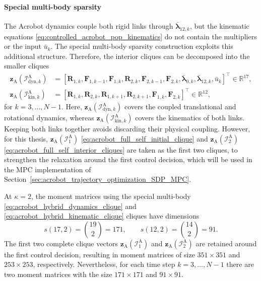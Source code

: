 \paragraph{Special multi-body sparsity}
The Acrobot dynamics couple both rigid links through
$\bar{\bm{\lambda}}_{12,k}$, but the kinematic equations \eqref{eq:controlled_acrobot_pop_kinematics}
do not contain the
multipliers or the input $\bar u_k$. The special multi-body sparsity construction exploits this
additional structure. Therefore, the interior cliques can be decomposed into the smaller cliques
\begin{subequations}
\label{eq:acrobot_hybrid_self_cliques}
\begin{align}
\bm{z}_{\mathrm{A}}(\mathcal I_{\mathrm{dyn},k}^{\mathrm{A}})
&=
\left[
\bm{R}_{1,k},
\bm{F}_{1,k-1},
\bm{F}_{1,k},
\bm{R}_{2,k},
\bm{F}_{2,k-1},
\bm{F}_{2,k},
\bar{\bm{\lambda}}_{0,k},
\bar{\bm{\lambda}}_{12,k},
\bar u_k
\right]^{\top}
\in\mathbb R^{17},
\label{eq:acrobot_hybrid_dynamics_clique}\\
\bm{z}_{\mathrm{A}}(\mathcal I_{\mathrm{kin},k}^{\mathrm{A}})
&=
\left[
\bm{R}_{1,k},
\bm{R}_{2,k},
\bm{R}_{1,k+1},
\bm{R}_{2,k+1},
\bm{F}_{1,k},
\bm{F}_{2,k}
\right]^{\top}
\in\mathbb R^{12},
\label{eq:acrobot_hybrid_kinematic_clique}
\end{align}
\end{subequations}
for $k=3,\ldots,N-1$. Here,
\(\bm{z}_{\mathrm{A}}(\mathcal I_{\mathrm{dyn},k}^{\mathrm{A}})\) covers the
coupled translational and rotational dynamics, whereas
\(\bm{z}_{\mathrm{A}}(\mathcal I_{\mathrm{kin},k}^{\mathrm{A}})\) covers the
kinematics of both links. Keeping both links together avoids
discarding their physical coupling. However, for this thesis,
\(\bm{z}_{\mathrm{A}}(\mathcal I_1^{\mathrm{A}})\)
\eqref{eq:acrobot_full_self_initial_clique} and
\(\bm{z}_{\mathrm{A}}(\mathcal I_2^{\mathrm{A}})\)
\eqref{eq:acrobot_full_self_interior_cliques} are taken as the first two cliques,
to strengthen the relaxation around the first control decision, which will be used in the MPC implementation 
of Section~\ref{sec:acrobot_trajectory_optimization_SDP_MPC}.

At $\kappa=2$, the
moment matrices using the special multi-body \eqref{eq:acrobot_hybrid_dynamics_clique} 
and \eqref{eq:acrobot_hybrid_kinematic_clique}
cliques have dimensions
\begin{equation}
s(17,2)=\binom{19}{2}=171,
\qquad
s(12,2)=\binom{14}{2}=91.
\label{eq:acrobot_hybrid_self_moment_sizes}
\end{equation}
The first two complete clique vectors
\(\bm{z}_{\mathrm{A}}(\mathcal I_1^{\mathrm{A}})\) and
\(\bm{z}_{\mathrm{A}}(\mathcal I_2^{\mathrm{A}})\) are retained around the first
control decision, resulting in moment matrices of size
\(351\times351\) and \(253\times253\), respectively.
Nevertheless, for each time step $k=3,\ldots,N-1$ there
are two moment matrices with the size $171\times171$ and
$91\times91$.

